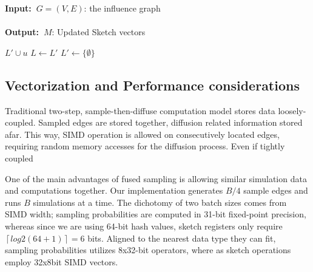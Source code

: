 \documentclass[10pt,journal,compsoc]{IEEEtran}
\renewcommand{\algorithmicrequire}{\textbf{Input:~}}
\renewcommand{\algorithmicensure}{\textbf{Output:~}}
\begin{document}
\begin{algorithm}[!ht]
\caption{($G,M,J,R_S$)}
\label{algo:diffusion-step}
\algorithmicrequire{$G = (V,E)$: the influence graph
\\
\\}
\algorithmicensure{$M$: Updated Sketch vectors
}
\begin{algorithmic}[1]
            \For{$j \in (0,J]$}
                \EndIf
            \EndFor
                \State $L' \cup u $
            \EndIf
        \EndFor
        \State $L \leftarrow L'$
        \State $L' \leftarrow \{\emptyset\}$
    \EndWhile
\end{algorithmic}
\end{algorithm}
\FloatBarrier
\subsection{Vectorization and Performance considerations}

Traditional two-step, sample-then-diffuse computation model stores data loosely-coupled. Sampled edges are stored together, diffusion related information stored afar. This way, SIMD operation is allowed on consecutively located edges, requiring random memory accesses for the diffusion process. Even if tightly coupled
 
One of the main advantages of fused sampling is allowing similar simulation data and computations together. 
Our implementation generates $B/4$ sample edges and runs $B$ simulations at a time. 
The dichotomy of two batch sizes comes from SIMD width; 
sampling probabilities are computed in 31-bit fixed-point precision, 
whereas since we are using 64-bit hash values, sketch registers only require $\left\lceil log2(64+1) \right\rceil = 6$ bits. Aligned to the nearest data type they can fit, sampling probabilities utilizes 8x32-bit operators, where as sketch operations employ 32x8bit SIMD vectors.
\end{document}

